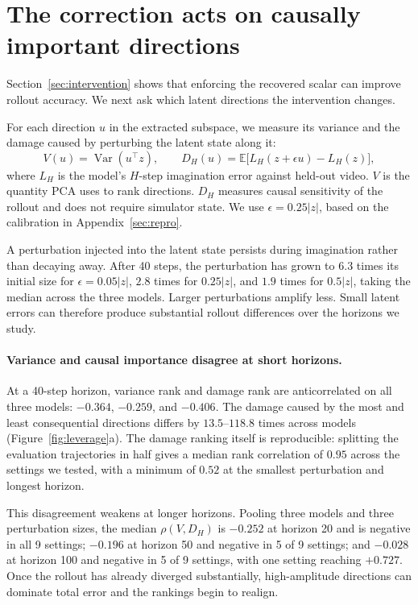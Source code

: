 \section{The correction acts on causally important directions}
\label{sec:leverage}

Section~\ref{sec:intervention} shows that enforcing the recovered scalar can improve rollout
accuracy. We next ask which latent directions the intervention changes.

For each direction $u$ in the extracted subspace, we measure its variance and the damage caused by
perturbing the latent state along it:
\begin{equation}
V(u) = \operatorname{Var}(u^\top z), \qquad
D_H(u) = \mathbb{E}\bigl[L_H(z+\epsilon u) - L_H(z)\bigr],
\label{eq:leverage}
\end{equation}
where $L_H$ is the model's $H$-step imagination error against held-out video. $V$ is the quantity PCA
uses to rank directions. $D_H$ measures causal sensitivity of the rollout and does not require
simulator state. We use $\epsilon = 0.25|z|$, based on the calibration in Appendix~\ref{sec:repro}.

A perturbation injected into the latent state persists during imagination rather than decaying away.
After 40 steps, the perturbation has grown to $6.3$ times its initial size for $\epsilon = 0.05|z|$,
$2.8$ times for $0.25|z|$, and $1.9$ times for $0.5|z|$, taking the median across the three models.
Larger perturbations amplify less. Small latent errors can therefore produce substantial rollout
differences over the horizons we study.

\paragraph{Variance and causal importance disagree at short horizons.} At a 40-step horizon,
variance rank and damage rank are anticorrelated on all three models: $-0.364$, $-0.259$, and
$-0.406$. The damage caused by the most and least consequential directions differs by
$13.5$--$118.8$ times across models (Figure~\ref{fig:leverage}a). The damage ranking itself is
reproducible: splitting the evaluation trajectories in half gives a median rank correlation of
$0.95$ across the settings we tested, with a minimum of $0.52$ at the smallest perturbation and
longest horizon.

This disagreement weakens at longer horizons. Pooling three models and three perturbation sizes, the
median $\rho(V, D_H)$ is $-0.252$ at horizon 20 and is negative in all 9 settings; $-0.196$ at
horizon 50 and negative in 5 of 9 settings; and $-0.028$ at horizon 100 and negative in 5 of 9
settings, with one setting reaching $+0.727$. Once the rollout has already diverged substantially,
high-amplitude directions can dominate total error and the rankings begin to realign.

